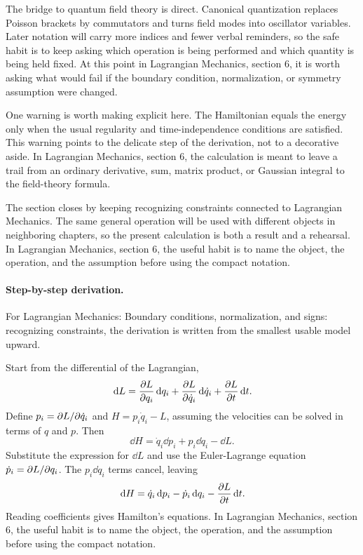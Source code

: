 The bridge to quantum field theory is direct.  Canonical quantization replaces Poisson brackets by commutators and turns field modes into oscillator variables.  Later notation will carry more indices and fewer verbal reminders, so the safe habit is to keep asking which operation is being performed and which quantity is being held fixed.  At this point in Lagrangian Mechanics, section 6, it is worth asking what would fail if the boundary condition, normalization, or symmetry assumption were changed.

One warning is worth making explicit here.  The Hamiltonian equals the energy only when the usual regularity and time-independence conditions are satisfied.  This warning points to the delicate step of the derivation, not to a decorative aside.  In Lagrangian Mechanics, section 6, the calculation is meant to leave a trail from an ordinary derivative, sum, matrix product, or Gaussian integral to the field-theory formula.

The section closes by keeping recognizing constraints connected to Lagrangian Mechanics.  The same general operation will be used with different objects in neighboring chapters, so the present calculation is both a result and a rehearsal.  In Lagrangian Mechanics, section 6, the useful habit is to name the object, the operation, and the assumption before using the compact notation.



\paragraph{Step-by-step derivation.}

For Lagrangian Mechanics: Boundary conditions, normalization, and signs: recognizing constraints, the derivation is written from the smallest usable model upward.

Start from the differential of the Lagrangian,
\[
  \,\mathrm d L=\frac{\partial L}{\partial q_i}\,\mathrm d q_i+\frac{\partial L}{\partial\dot q_i}\,\mathrm d\dot q_i+\frac{\partial L}{\partial t}\,\mathrm d t.
\]
Define \(p_i=\partial L/\partial\dot q_i\) and \(H=p_i\dot q_i-L\), assuming the velocities can be solved in terms of \(q\) and \(p\).  Then
\[
  \dd H=\dot q_i\dd p_i+p_i\dd\dot q_i-\dd L.
\]
Substitute the expression for \(\dd L\) and use the Euler-Lagrange equation \(\dot p_i=\partial L/\partial q_i\).  The \(p_i\dd\dot q_i\) terms cancel, leaving
\[
  \,\mathrm d H=\dot q_i\,\mathrm d p_i-\dot p_i\,\mathrm d q_i-\frac{\partial L}{\partial t}\,\mathrm d t.
\]
Reading coefficients gives Hamilton's equations.  In Lagrangian Mechanics, section 6, the useful habit is to name the object, the operation, and the assumption before using the compact notation.


